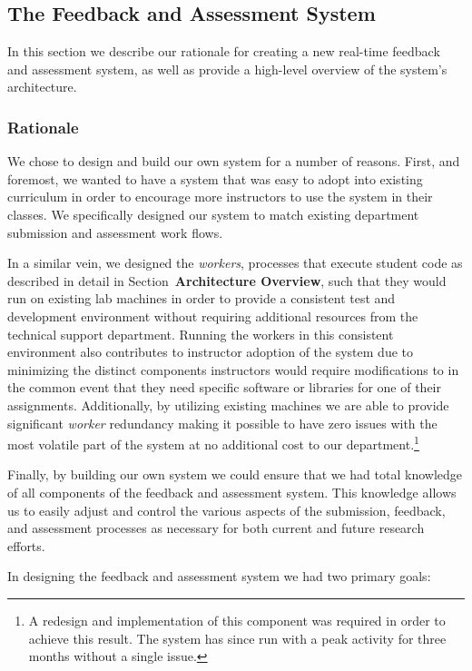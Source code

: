 \subsection{The Feedback and Assessment System}

In this section we describe our rationale for creating a new real-time feedback
and assessment system, as well as provide a high-level overview of the system's
architecture.

\subsubsection{Rationale}
We chose to design and build our own system for a number of reasons. First, and
foremost, we wanted to have a system that was easy to adopt into existing
curriculum in order to encourage more instructors to use the system in their
classes. We specifically designed our system to match existing department
submission and assessment work flows.

In a similar vein, we designed the \emph{workers}, processes that execute
student code as described in detail in Section~\textbf{Architecture Overview},
such that they would run on existing lab machines in order to provide a
consistent test and development environment without requiring additional
resources from the technical support department. Running the workers in this
consistent environment also contributes to instructor adoption of the system
due to minimizing the distinct components instructors would require
modifications to in the common event that they need specific software or
libraries for one of their assignments. Additionally, by utilizing existing
machines we are able to provide significant \emph{worker} redundancy making it
possible to have zero issues with the most volatile part of the system at no
additional cost to our department.\footnote{A redesign and implementation of
  this component was required in order to achieve this result. The system has
  since run with a peak activity for three months without a single issue.}

Finally, by building our own system we could ensure that we had total knowledge
of all components of the feedback and assessment system. This knowledge allows
us to easily adjust and control the various aspects of the submission,
feedback, and assessment processes as necessary for both current and future
research efforts.

In designing the feedback and assessment system we had two primary goals:

